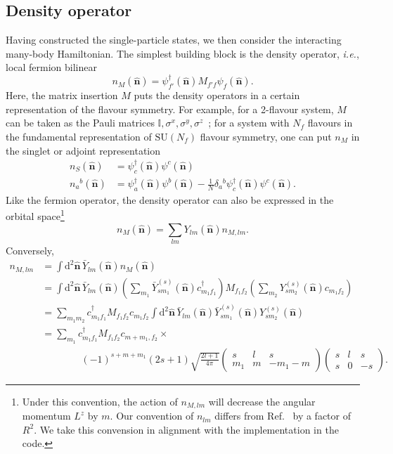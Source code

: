 \documentclass{timesjhep}
\begin{document}
\subsection{Density operator}
\label{sec:construct_den}

Having constructed the single-particle states, we then consider the interacting many-body Hamiltonian. The simplest building block is the density operator, \textit{i.e.}, local fermion bilinear
\begin{equation}
    n_M(\hat{\mathbf{n}})=\psi_{f'}^\dagger(\hat{\mathbf{n}})M_{f'f}\psi_f(\hat{\mathbf{n}}).
    \label{eq:den_def}
\end{equation}
Here, the matrix insertion $M$ puts the density operators in a certain representation of the flavour symmetry. For example, for a 2-flavour system, $M$ can be taken as the Pauli matrices $\mathbb{I},\sigma^x,\sigma^y,\sigma^z$~; for a system with $N_f$ flavours in the fundamental representation of $\mathrm{SU}(N_f)$ flavour symmetry, one can put $n_M$ in the singlet or adjoint representation
\begin{align}
    n_S(\hat{\mathbf{n}})&=\psi_{c}^\dagger(\hat{\mathbf{n}})\psi^c(\hat{\mathbf{n}})\nonumber\\
    n_a{}^b(\hat{\mathbf{n}})&=\psi_{a}^\dagger(\hat{\mathbf{n}})\psi^b(\hat{\mathbf{n}})-\tfrac{1}{N}\delta_{a}{}^b\psi_c^\dagger(\hat{\mathbf{n}})\psi^c(\hat{\mathbf{n}}).
\end{align}
Like the fermion operator, the density operator can also be expressed in the orbital space\footnote{Under this convention, the action of $n_{M,lm}$ will decrease the angular momentum $L^z$ by $m$. Our convention of $n_{lm}$ differs from Ref.~\cite{Hu2023Mar} by a factor of $R^2$. We take this convension in alignment with the implementation in the code.}
\begin{equation}
    n_M(\hat{\mathbf{n}})=\sum_{lm}Y_{lm}(\hat{\mathbf{n}})n_{M,lm}.
    \label{eq:den_decomp}
\end{equation}
Conversely,
\begin{align}
    n_{M,lm}&=\int\mathrm{d}^2\hat{\mathbf{n}}\,\bar{Y}_{lm}(\hat{\mathbf{n}})n_M(\hat{\mathbf{n}})\nonumber\\
    &=\int\mathrm{d}^2\hat{\mathbf{n}}\,\bar{Y}_{lm}(\hat{\mathbf{n}})\left(\sum_{m_1}\bar{Y}^{(s)}_{sm_1}(\hat{\mathbf{n}})c^\dagger_{m_1f_1}\right)M_{f_1f_2}\left(\sum_{m_2}Y^{(s)}_{sm_2}(\hat{\mathbf{n}})c_{m_1f_2}\right)\nonumber\\
    &=\sum_{m_1m_2}c^\dagger_{m_1f_1}M_{f_1f_2}c_{m_1f_2}\int\mathrm{d}^2\hat{\mathbf{n}}\,\bar{Y}_{lm}(\hat{\mathbf{n}})\bar{Y}^{(s)}_{sm_1}(\hat{\mathbf{n}})Y^{(s)}_{sm_2}(\hat{\mathbf{n}})\nonumber\\
    &=\sum_{m_1}c^\dagger_{m_1f_1}M_{f_1f_2}c_{m+m_1,f_2}\times\nonumber\\
    &\qquad\qquad(-1)^{s+m+m_1}(2s+1)\sqrt{\frac{2l+1}{4\pi}}\begin{pmatrix}s&l&s\\m_1&m&-m_1-m\end{pmatrix}\begin{pmatrix}s&l&s\\s&0&-s\end{pmatrix}.
    \label{eq:den_mod}
\end{align}
\end{document}
